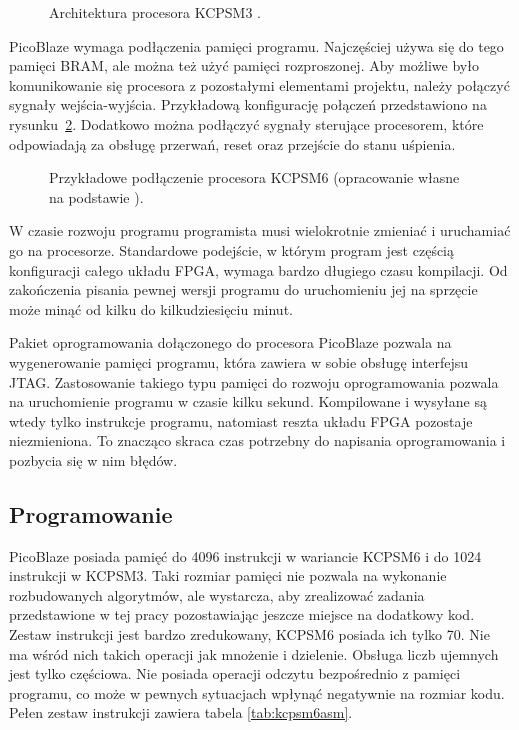 \begin{figure}[htb]
	\centering
	\caption{Architektura procesora KCPSM3 \cite{kcpsm3}. }
	\label{KCPSM3Arch}
\end{figure}



PicoBlaze wymaga podłączenia pamięci programu. Najczęściej używa się do tego pamięci BRAM, ale można też użyć pamięci rozproszonej. Aby możliwe było komunikowanie się procesora z pozostałymi elementami projektu, należy połączyć sygnały \mbox{wejścia-wyjścia}. Przykładową konfigurację połączeń przedstawiono na rysunku~\ref{KCPSM6IO}. Dodatkowo można podłączyć sygnały sterujące procesorem, które odpowiadają za obsługę przerwań, reset oraz przejście do stanu uśpienia.


\begin{figure}[htb]
	\centering
	\caption{Przykładowe podłączenie procesora KCPSM6 (opracowanie własne na podstawie \cite{kcpsm6}). }
	\label{KCPSM6IO}
\end{figure}


W czasie rozwoju programu programista musi wielokrotnie zmieniać i uruchamiać go na procesorze. Standardowe podejście, w którym program jest częścią konfiguracji całego układu FPGA, wymaga bardzo długiego czasu kompilacji. Od zakończenia pisania pewnej wersji programu do uruchomieniu jej na sprzęcie może minąć od kilku do kilkudziesięciu minut.

Pakiet oprogramowania dołączonego do procesora PicoBlaze pozwala na wygenerowanie pamięci programu, która zawiera w sobie obsługę interfejsu JTAG. Zastosowanie takiego typu pamięci do rozwoju oprogramowania pozwala na uruchomienie programu w czasie kilku sekund. Kompilowane i wysyłane są wtedy tylko instrukcje programu, natomiast reszta układu FPGA pozostaje niezmieniona. To znacząco skraca czas potrzebny do napisania oprogramowania i pozbycia się w nim błędów.



\subsection{Programowanie}


PicoBlaze posiada pamięć do 4096 instrukcji w wariancie KCPSM6 i do 1024 instrukcji w KCPSM3. Taki rozmiar pamięci nie pozwala na wykonanie rozbudowanych algorytmów, ale wystarcza, aby zrealizować zadania przedstawione w tej pracy pozostawiając jeszcze miejsce na dodatkowy kod. Zestaw instrukcji jest bardzo zredukowany, KCPSM6 posiada ich tylko 70. Nie ma wśród nich takich operacji jak mnożenie i dzielenie. Obsługa liczb ujemnych jest tylko częściowa. Nie posiada operacji odczytu bezpośrednio z pamięci programu, co może w pewnych sytuacjach wpłynąć negatywnie na rozmiar kodu. Pełen zestaw instrukcji zawiera tabela \ref{tab:kcpsm6asm}.

